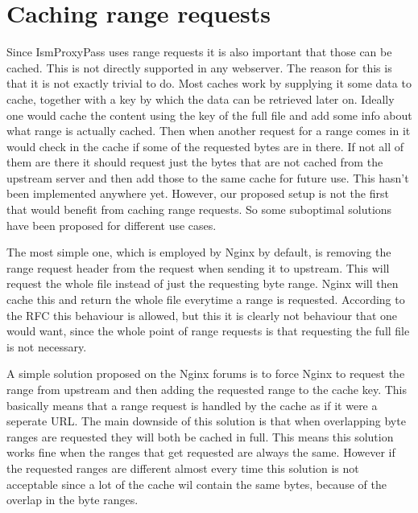 \documentclass[twoside,openright]{uva-bachelor-thesis}
\begin{document}
\section{Caching range requests}
Since IsmProxyPass uses range requests it is also important that those can be
cached. This is not directly supported in any webserver. The reason for
this is that it is not exactly trivial to do. Most caches work by supplying it
some data to cache, together with a key by which the data can be retrieved later
on.
Ideally one would cache the content using the key of the full file and add some
info about what range is actually cached. Then when another request for a range
comes in it would check in the cache if some of the requested bytes are in
there. If not all of them are there it should request just the bytes that are
not cached from the upstream server and then add those to the same cache for
future use. This hasn't been implemented anywhere yet. However, our proposed
setup is not the first that would benefit from caching range requests. So some
suboptimal solutions have been proposed for different use cases.

The most simple one, which is employed by Nginx by default,
is removing the range request header from the request when sending it to
upstream. This will request the whole file instead of just the requesting byte
range. Nginx will then cache this and return the whole file everytime a range is
requested. According to the RFC this behaviour is allowed, but this it is
clearly not behaviour that one would want, since the whole point of range
requests is that requesting the full file is not necessary.

A simple solution proposed on the Nginx forums\autocite{nginxcacheforum} is to
force Nginx to request the range from upstream and then adding the requested
range to the cache key. This basically means that a range request is handled by
the cache as if it were a seperate URL\@. The main downside of this solution is that
when overlapping byte ranges are requested they will both be cached in full.
This means this  solution works fine when the ranges that get requested are
always the same. However if the requested ranges are different almost every
time this solution is not acceptable since a lot of the cache wil contain the
same bytes, because of the overlap in the byte ranges.

\end{document}
